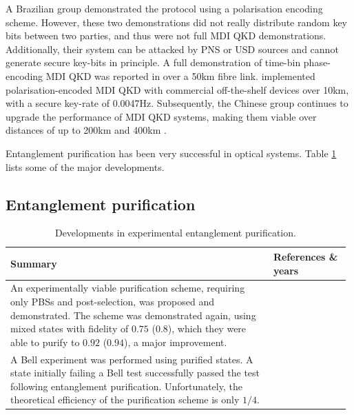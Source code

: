 \documentclass[aps,rmp,twocolumn,amsmath,amssymb,nofootinbib,superscriptaddress,longbibliography,floatfix,table-of-contents,eqsecnum]{revtex4-1}
\newcommand{\comment}[1]{{\color{blue}{\textbf{#1}}}}
\begin{document}
A Brazilian group \cite{bib:PRA_88_052303} demonstrated the protocol using a polarisation encoding scheme. However, these two demonstrations did not really distribute random key bits between two parties, and thus were not full MDI QKD demonstrations. Additionally, their system can be attacked by PNS or USD \comment{Define these acronyms!} sources and cannot generate secure key-bits in principle. A full demonstration of time-bin phase-encoding MDI QKD was reported in \cite{bib:PRL_111_130502} over a 50km fibre link. \cite{bib:PRL_112_190503} implemented polarisation-encoded MDI QKD with commercial off-the-shelf devices over 10km, with a secure key-rate of 0.0047Hz. Subsequently, the Chinese group continues to upgrade the performance of MDI QKD systems, making them viable over distances of up to 200km \cite{bib:PRL_113_190501} and 400km \cite{bib:arx160606821}.

%
%

Entanglement purification has been very successful in optical systems. Table \ref{tab:ent_pur} lists some of the major developments.

\subsection{Entanglement purification} 

\begin{table}[!htb]
\caption{Developments in experimental entanglement purification.} \label{tab:ent_pur}
\begin{tabular}{|p{0.755\linewidth}|p{0.22\linewidth}|}
	\hline
	Summary & References \& years \\
	\hline \hline
	An experimentally viable purification scheme, requiring only PBSs and post-selection, was proposed and demonstrated. The scheme was demonstrated again, using mixed states with fidelity of $0.75$ ($0.8$), which they were able to purify to $0.92$ ($0.94$), a major improvement. & \cite{bib:Nature_410_1067, bib:Nature_423_417} \\
	\hline
	A Bell experiment was performed using purified states. A state initially failing a Bell test successfully passed the test following entanglement purification. Unfortunately, the theoretical efficiency of the purification scheme is only $1/4$. & \cite{bib:PRL_94_040504, bib:Nature_410_1067} \\
	\hline
\end{tabular}
\end{table}
\end{document}
